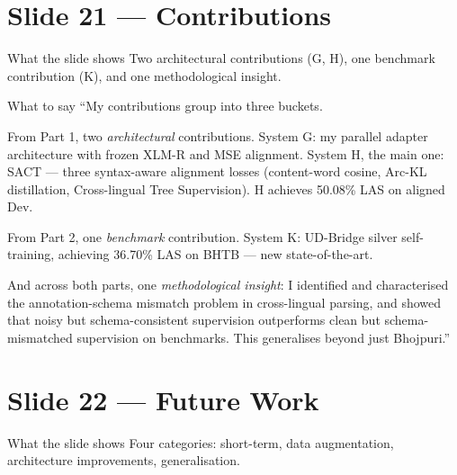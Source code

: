 \documentclass[11pt]{article}
\begin{document}
\section{Slide 21 --- Contributions}

\begin{pitchbox}{What the slide shows}
Two architectural contributions (G, H), one benchmark contribution (K), and one methodological insight.
\end{pitchbox}

\begin{pitchbox}{What to say}
``My contributions group into three buckets.

From Part 1, two \textit{architectural} contributions. System G: my parallel adapter architecture with frozen XLM-R and MSE alignment. System H, the main one: SACT --- three syntax-aware alignment losses (content-word cosine, Arc-KL distillation, Cross-lingual Tree Supervision). H achieves 50.08\% LAS on aligned Dev.

From Part 2, one \textit{benchmark} contribution. System K: UD-Bridge silver self-training, achieving 36.70\% LAS on BHTB --- new state-of-the-art.

And across both parts, one \textit{methodological insight}: I identified and characterised the annotation-schema mismatch problem in cross-lingual parsing, and showed that noisy but schema-consistent supervision outperforms clean but schema-mismatched supervision on benchmarks. This generalises beyond just Bhojpuri.''
\end{pitchbox}

\section{Slide 22 --- Future Work}

\begin{pitchbox}{What the slide shows}
Four categories: short-term, data augmentation, architecture improvements, generalisation.
\end{pitchbox}
\end{document}
